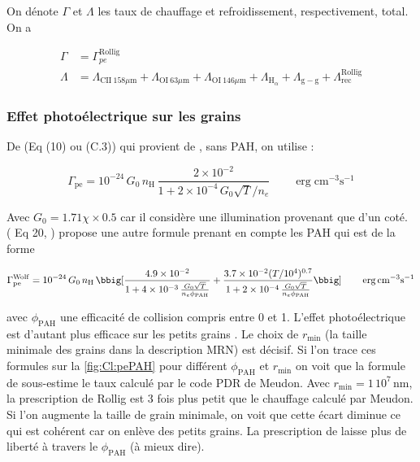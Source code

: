 On dénote $\Gamma$ et $\Lambda$ les taux de chauffage et refroidissement, respectivement, total. On a 

\begin{equation}
    \begin{split}
        \Gamma &= \Gamma_{pe}^{\mathrm{Rollïg}} \\
        \Lambda &=   \Lambda_{\mathrm{CII}\ 158 \mu \mathrm{m}} + \Lambda_{\mathrm{OI}\ 63 \mu \mathrm{m}} + \Lambda_{\mathrm{OI}\ 146 \mu \mathrm{m}}  + \Lambda_{\mathrm{H}_\alpha} + \Lambda_{\mathrm{g}-\mathrm{g}} + \Lambda_{\mathrm{rec}}^{\mathrm{Rollïg}}
    \end{split}
\end{equation}


\subsubsection{Effet photoélectrique sur les grains}

De \cite{Rollig2005} (Eq (10) ou (C.3)) qui provient de \cite{BakesTielens1994}, sans PAH, on utilise : 

\begin{equation}
    \Gamma_{\mathrm{pe}} = 10^{-24}\,G_0\,n_\mathrm{H}\, \frac{2\times 10^{-2}}{1 + 2\times 10^{-4}\,G_0 \sqrt{T}/n_e} \qquad \operatorname{erg} \mathrm{cm}^{-3} \mathrm{s}^{-1}
    \label{eq:Rollig:pe}
\end{equation}

Avec $G_0 = 1.71\chi \times 0.5$ car il considère une illumination provenant que d'un coté. (\cite{Wolfire_2003} Eq 20, \cite{BakesTielens1994}) propose une autre formule prenant en compte les PAH qui est de la forme 

\begin{equation}
    \Gamma_{\mathrm{pe}}^{\mathrm{Wolf}} = 10^{-24}\,G_0\,n_\mathrm{H}\, \bbig[ \frac{4.9\times 10^{-2}}{1 + 4\times 10^{-3}\, \frac{G_0 \sqrt{T}}{n_e \phi_\mathrm{PAH}}} + \frac{3.7\times 10^{-2} (T/10^4)^{0.7}}{1 + 2\times 10^{-4}\, \frac{G_0 \sqrt{T}}{n_e \phi_\mathrm{PAH}}} \bbig]\qquad  \operatorname{erg} \mathrm{cm}^{-3} \mathrm{s}^{-1}
\end{equation}

avec $\phi_\mathrm{PAH}$ une efficacité de collision compris entre 0 et 1. L'effet photoélectrique est d'autant plus efficace sur les petits grains \cite{DraineBook}. Le choix de $r_\mathrm{min}$ (la taille minimale des grains dans la description MRN) est décisif. Si l'on trace ces formules sur la \autoref{fig:Cl:pePAH} pour différent $\phi_\mathrm{PAH}$ et $r_\mathrm{min}$ on voit que la formule de \cite{Rollig2005} sous-estime le taux calculé par le code PDR de Meudon. Avec $r_\mathrm{min} = 1\,10^7\,\mathrm{nm}$, la prescription de Rollig est 3 fois plus petit que le chauffage calculé par Meudon. Si l'on augmente la taille de grain minimale, on voit que cette écart diminue ce qui est cohérent car on enlève des petits grains. La prescription de \cite{Wolfire_2003} laisse plus de liberté à travers le $\phi_\mathrm{PAH}$ (à mieux dire).

